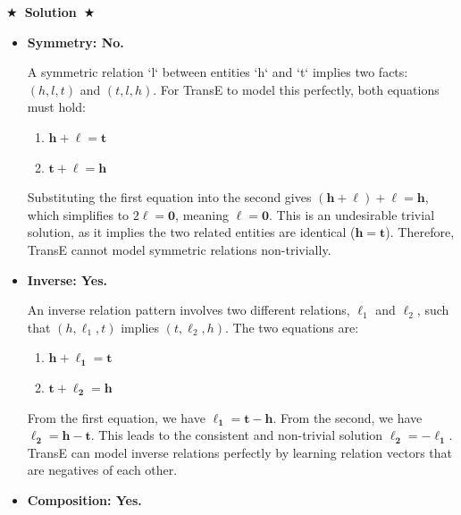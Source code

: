\documentclass{article}
\numberwithin{figure}{section}
\newcommand{\Solution}[1]{%
    {%
        \medskip
        \color{red}
        \bf $\bigstar$~\sf\textbf{Solution}~$\bigstar$ \sf
        #1
    }
    \bigskip
}
\begin{document}
\Solution{
	\begin{itemize}
		\item \textbf{Symmetry: No.}
		
		A symmetric relation `l` between entities `h` and `t` implies two facts: $(h, l, t)$ and $(t, l, h)$. For TransE to model this perfectly, both equations must hold:
		\begin{enumerate}
			\item $\mathbf{h} + \boldsymbol{\ell} = \mathbf{t}$
			\item $\mathbf{t} + \boldsymbol{\ell} = \mathbf{h}$
		\end{enumerate}
		Substituting the first equation into the second gives $(\mathbf{h} + \boldsymbol{\ell}) + \boldsymbol{\ell} = \mathbf{h}$, which simplifies to $2\boldsymbol{\ell} = \mathbf{0}$, meaning $\boldsymbol{\ell} = \mathbf{0}$. This is an undesirable trivial solution, as it implies the two related entities are identical ($\mathbf{h} = \mathbf{t}$). Therefore, TransE cannot model symmetric relations non-trivially.
		
		\item \textbf{Inverse: Yes.}
		
		An inverse relation pattern involves two different relations, $\ell_1$ and $\ell_2$, such that $(h, \ell_1, t)$ implies $(t, \ell_2, h)$. The two equations are:
		\begin{enumerate}
			\item $\mathbf{h} + \boldsymbol{\ell_1} = \mathbf{t}$
			\item $\mathbf{t} + \boldsymbol{\ell_2} = \mathbf{h}$
		\end{enumerate}
		From the first equation, we have $\boldsymbol{\ell_1} = \mathbf{t} - \mathbf{h}$. From the second, we have $\boldsymbol{\ell_2} = \mathbf{h} - \mathbf{t}$. This leads to the consistent and non-trivial solution $\boldsymbol{\ell_2} = - \boldsymbol{\ell_1}$. TransE can model inverse relations perfectly by learning relation vectors that are negatives of each other.
		
		\item \textbf{Composition: Yes.}
		

\end{itemize}}
\end{document}
